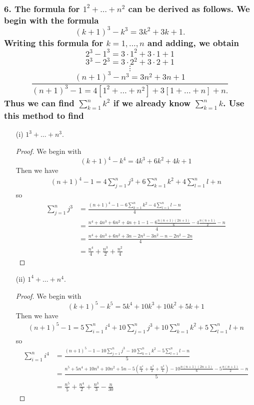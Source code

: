 \documentclass{article}
\begin{document}
\subsubsection*{6. The formula for $1^2 + \dots + n^2$ can be derived as follows. We begin with the formula \[(k + 1)^3 - k^3 = 3k^2 + 3k + 1.\] Writing this formula for $k = 1, \dots, n$ and adding, we obtain \[2^3 - 1^3 = 3 \cdot 1^2 + 3 \cdot 1 + 1\] \[ 3^3 - 2^3 = 3 \cdot 2^2 + 3 \cdot 2 + 1 \] \[\vdots\]\[ \frac{(n + 1)^3 - n^3 = 3n^2 + 3n + 1}{(n + 1)^3 - 1 = 4[1^2 + \dots + n^2] + 3[1 + \dots + n] + n.} \] Thus we can find $\sum_{k=1}^{n}k^2$ if we already know $\sum_{k=1}^{n}k$. Use this method to find}
\begin{enumerate}
	\item[(i)] $1^3 + \dots + n^3$.
	\begin{proof}
		We begin with \[ (k + 1)^4 - k^4 = 4k^3 + 6k^2 + 4k + 1 \]
		Then we have
		\begin{align*}
			(n + 1)^4 - 1 = 4\sum_{j=1}^{n}j^3 + 6\sum_{k=1}^{n}k^2 + 4\sum_{l=1}^{n}l + n
		\end{align*} so
		\begin{align*}
			\sum_{j=1}^{n}j^3 &= \frac{(n + 1)^4 - 1 - 6\sum_{k=1}^{n}k^2 - 4\sum_{l=1}^{n}l - n}{4} \\&= \frac{n^4 + 4n^3 + 6n^2 + 4n + 1 - 1 - 6\frac{n(n+1)(2n+1)}{6} - 4\frac{n(n+1)}{2} - n}{4} \\&= \frac{n^4 + 4n^3 + 6n^2 + 3n - 2n^3 - 3n^2 - n - 2n^2 -2n}{4} \\&= \frac{n^4}{4} + \frac{n^3}{2} + \frac{n^2}{4}
		\end{align*}
	\end{proof}
	\item[(ii)] $1^4 + \dots + n^4$.
	\begin{proof}
		We begin with \[ (k + 1)^5 - k^5 = 5k^4 + 10k^3 + 10k^2 + 5k + 1 \]
		Then we have
		\begin{align*}
			(n + 1)^5 - 1 = 5\sum_{i=1}^{n}i^4 + 10\sum_{j=1}^{n}j^3 + 10\sum_{k=1}^{n}k^2 + 5\sum_{l=1}^{n}l + n
		\end{align*} so
		\begin{align*}
			\sum_{i=1}^{n}i^4 &= \frac{(n + 1)^5 - 1 - 10\sum_{j=1}^{n}j^3 - 10\sum_{k=1}^{n}k^2 - 5\sum_{l=1}^{n}l - n}{5} \\&= \frac{n^5 + 5n^4 + 10n^3 + 10n^2 + 5n - 5\left(\frac{n^4}{4} + \frac{n^3}{2} + \frac{n^2}{4}\right) - 10\frac{n(n + 1)(2n + 1)}{6} - 5\frac{n(n+1)}{2} - n}{5} \\&= \frac{n^5}{5} + \frac{n^4}{2} + \frac{n^3}{3} - \frac{n}{30}

\end{align*}
\end{proof}
\end{enumerate}
\end{document}
